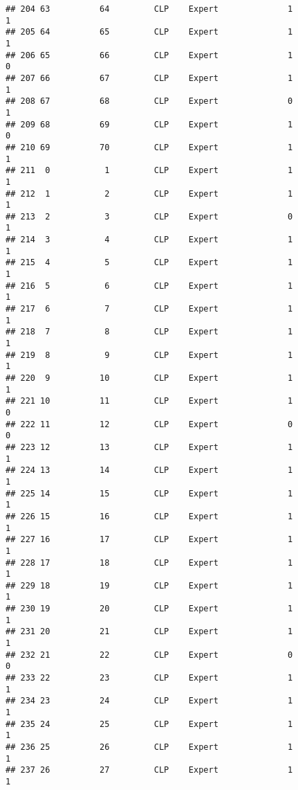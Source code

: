 \documentclass[
]{article}
\begin{document}
\begin{verbatim}
## 204 63          64         CLP    Expert              1                 1
## 205 64          65         CLP    Expert              1                 1
## 206 65          66         CLP    Expert              1                 0
## 207 66          67         CLP    Expert              1                 1
## 208 67          68         CLP    Expert              0                 1
## 209 68          69         CLP    Expert              1                 0
## 210 69          70         CLP    Expert              1                 1
## 211  0           1         CLP    Expert              1                 1
## 212  1           2         CLP    Expert              1                 1
## 213  2           3         CLP    Expert              0                 1
## 214  3           4         CLP    Expert              1                 1
## 215  4           5         CLP    Expert              1                 1
## 216  5           6         CLP    Expert              1                 1
## 217  6           7         CLP    Expert              1                 1
## 218  7           8         CLP    Expert              1                 1
## 219  8           9         CLP    Expert              1                 1
## 220  9          10         CLP    Expert              1                 1
## 221 10          11         CLP    Expert              1                 0
## 222 11          12         CLP    Expert              0                 0
## 223 12          13         CLP    Expert              1                 1
## 224 13          14         CLP    Expert              1                 1
## 225 14          15         CLP    Expert              1                 1
## 226 15          16         CLP    Expert              1                 1
## 227 16          17         CLP    Expert              1                 1
## 228 17          18         CLP    Expert              1                 1
## 229 18          19         CLP    Expert              1                 1
## 230 19          20         CLP    Expert              1                 1
## 231 20          21         CLP    Expert              1                 1
## 232 21          22         CLP    Expert              0                 0
## 233 22          23         CLP    Expert              1                 1
## 234 23          24         CLP    Expert              1                 1
## 235 24          25         CLP    Expert              1                 1
## 236 25          26         CLP    Expert              1                 1
## 237 26          27         CLP    Expert              1                 1

\end{verbatim}
\end{document}
